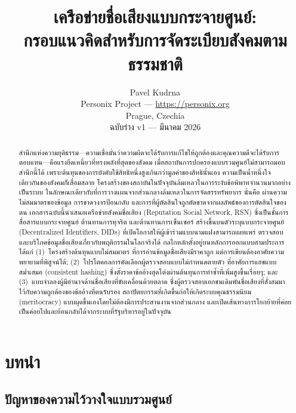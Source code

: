 \documentclass[11pt,a4paper,twocolumn]{article}
\title{\textbf{เครือข่ายชื่อเสียงแบบกระจายศูนย์:\\กรอบแนวคิดสำหรับการจัดระเบียบสังคมตามธรรมชาติ}}
\author{Pavel Kudrna\\Personix Project --- \url{https://personix.org}\\Prague, Czechia\\ฉบับร่าง v1 --- มีนาคม 2026}
\date{}
\begin{document}
\maketitle

\begin{abstract}
สำนึกแห่งความยุติธรรม---ความเชื่อมั่นว่าความผิดจะได้รับการแก้ไขให้ถูกต้องและคุณความดีจะได้รับการตอบแทน---คือแรงยึดเหนี่ยวที่ทรงพลังที่สุดของสังคม เมื่อสถาบันการปกครองแบบรวมศูนย์ไม่สามารถมอบสำนึกนี้ได้ เพราะต้นทุนของการบังคับใช้สิทธิหนึ่งสูงเกินกว่ามูลค่าของสิทธินั้นเอง ความเป็นน้ำหนึ่งใจเดียวกันของสังคมก็เสื่อมสลาย โครงสร้างของสถาบันในปัจจุบันล้มเหลวในการระงับข้อพิพาทจำนวนมากอย่างเป็นระบบ ในลักษณะเดียวกับที่การวางแผนจากส่วนกลางล้มเหลวในการจัดสรรทรัพยากร นั่นคือ ผ่านความไม่สมมาตรของข้อมูล การขาดวงจรป้อนกลับ และการที่ผู้ตัดสินใจถูกตัดขาดจากผลลัพธ์ของการตัดสินใจของตน เอกสารฉบับนี้นำเสนอเครือข่ายสังคมชื่อเสียง (Reputation Social Network, RSN) ซึ่งเป็นชั้นการสื่อสารแบบกระจายศูนย์ ต้านทานการทุจริต และต้านทานการเซ็นเซอร์ สร้างขึ้นบนตัวระบุแบบกระจายศูนย์ (Decentralized Identifiers, DIDs) ที่เปิดโอกาสให้ผู้เข้าร่วมแบบนามแฝงสามารถเผยแพร่ ตรวจสอบ และบริโภคข้อมูลชื่อเสียงเกี่ยวกับพฤติกรรมในโลกจริงได้ กลไกหลักตั้งอยู่บนหลักการออกแบบสามประการ ได้แก่ (1)~โครงสร้างต้นทุนแบบไม่สมมาตร ที่การอ่านข้อมูลชื่อเสียงมีราคาถูก แต่การเขียนต้องอาศัยความพยายามที่พิสูจน์ได้; (2)~โปรโตคอลการคัดเลือกผู้ตรวจสอบแบบไม่กำหนดตายตัว ที่อาศัยการแฮชแบบสม่ำเสมอ (consistent hashing) ซึ่งตั้งราคาข้ออ้างสุดโต่งผ่านต้นทุนการทำซ้ำที่เพิ่มสูงขึ้นเรื่อยๆ; และ (3)~แบบจำลองผู้มีอำนาจด้านชื่อเสียงที่ขับเคลื่อนด้วยตลาด ซึ่งผู้ตรวจสอบเอกชนเดิมพันชื่อเสียงที่สั่งสมมาไว้กับความถูกต้องของข้ออ้างที่ตนรับรอง สถาปัตยกรรมที่เกิดขึ้นก่อให้เกิดระบบคุณธรรมนิยม (meritocracy) แบบผุดขึ้นเองโดยไม่ต้องมีการประสานงานจากส่วนกลาง และเปิดเส้นทางการโยกย้ายที่ค่อยเป็นค่อยไปและย้อนกลับได้จากระบบที่รัฐบริหารอยู่ในปัจจุบัน
\end{abstract}

\section{บทนำ}

\subsection{ปัญหาของความไว้วางใจแบบรวมศูนย์}
\end{document}
